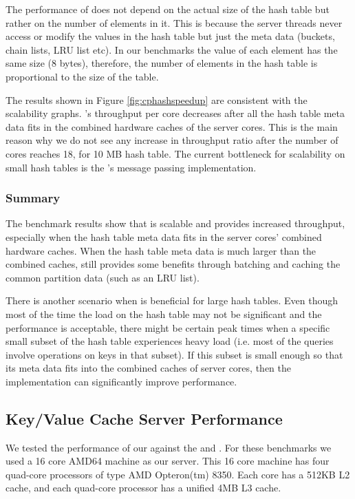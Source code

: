 The performance of \cphash{} does not depend on the actual size of the hash table but rather on the number of elements in it. This is because the server 
threads never access or modify the values in the hash table but just the meta data (buckets, chain lists, LRU list etc). In our benchmarks the value of 
each element has the same size (8 bytes), therefore, the number of elements in the hash table is proportional to the size of the table.

The results shown in Figure \ref{fig:cphashspeedup} are consistent with the scalability graphs. \cphash{}'s throughput per core decreases after all 
the hash table meta data fits in the combined hardware caches of the server cores. This is the main reason why we do not see any increase in throughput ratio after 
the number of cores reaches 18, for 10 MB hash table. The current bottleneck for scalability on small hash tables is the \cphash{}'s message passing implementation.

\subsubsection{Summary}

The benchmark results show that \cphash{} is scalable and provides increased throughput, especially when the hash table meta data fits in the server cores'
combined hardware caches. When the hash table meta data is much larger than the combined caches, \cphash{} still provides some benefits through batching and caching 
the common partition data (such as an LRU list).

There is another scenario when \cphash{} is beneficial for large hash tables. Even though most of the time the load on the hash table may not be significant
and the performance is acceptable, there might be certain peak times when a specific small subset of the hash table experiences heavy load (i.e. most of the queries involve 
operations on keys in that subset). If this subset is small enough so that its meta data fits into the combined caches of server cores, then the \cphash{} 
implementation can significantly improve performance.

\subsection{Key/Value Cache Server Performance}
\label{sec:mcserverbench} 

We tested the performance of our \cpserver{} against the \lockserver{} and \memcached{}. For these benchmarks we used a 16 core AMD64 machine as 
our server. This 16 core machine has four quad-core processors of type AMD Opteron(tm) 8350. Each core has a 512KB L2 cache, and each quad-core processor has a 
unified 4MB L3 cache. 

